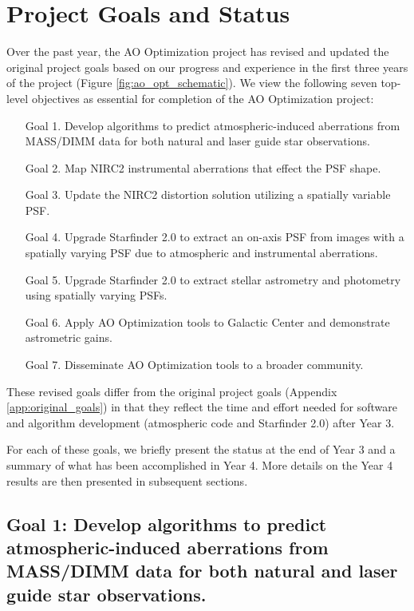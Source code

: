 \section{Project Goals and Status}
\label{sec:overview}

Over the past year, the AO Optimization project has revised and
updated the original project goals based on our progress and
experience in the first three years of the project 
(Figure \ref{fig:ao_opt_schematic}). We view the
following seven top-level objectives as essential for completion of
the AO Optimization project:
\begin{enumerate}
\item[Goal 1.] Develop algorithms to predict atmospheric-induced aberrations
  from MASS/DIMM data for both natural and laser guide star observations.
\item[Goal 2.] Map NIRC2 instrumental aberrations that effect the PSF shape.
\item[Goal 3.] Update the NIRC2 distortion solution utilizing a spatially
  variable PSF.
\item[Goal 4.] Upgrade Starfinder 2.0 to extract an on-axis PSF from images with
  a spatially varying PSF due to atmospheric and instrumental aberrations.
\item[Goal 5.] Upgrade Starfinder 2.0 to extract stellar astrometry and
  photometry using spatially varying PSFs.
\item[Goal 6.] Apply AO Optimization tools to Galactic Center and demonstrate
  astrometric gains.
\item[Goal 7.] Disseminate AO Optimization tools to a broader community.
\end{enumerate}
These revised goals differ from the original project goals 
(Appendix \ref{app:original_goals}) in that
they reflect the time and effort needed for software and
algorithm development (atmospheric code and Starfinder 2.0) after Year
3. 


For each of these goals, we briefly present the status at the end of
Year 3 and a summary of what has been accomplished in Year 4. More
details on the Year 4 results are then presented in subsequent
sections.


\subsection{Goal 1: Develop algorithms to predict atmospheric-induced aberrations
  from MASS/DIMM data for both natural and laser guide star observations.}

